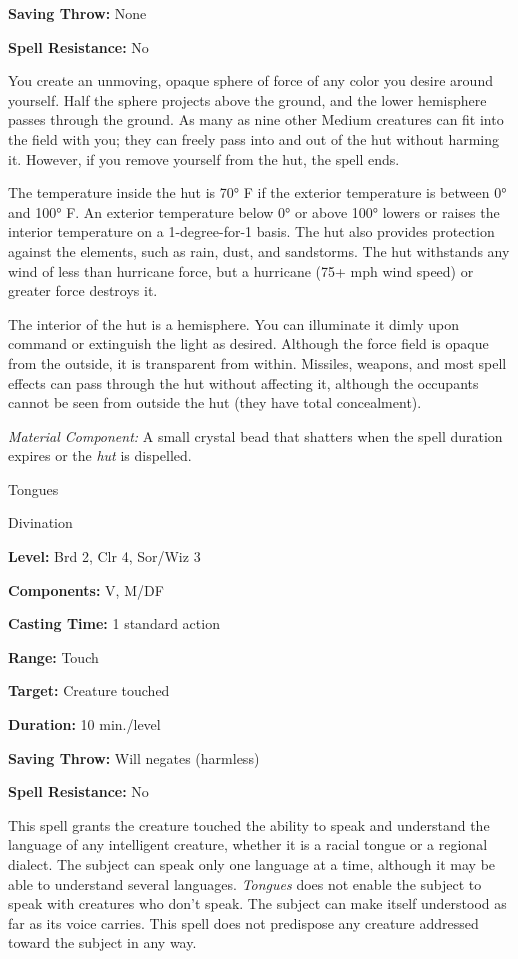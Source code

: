 \documentclass{article}
\begin{document}
\textbf{Saving Throw:} None

\textbf{Spell Resistance:} No

You create an unmoving, opaque sphere of force of any color you desire around yourself. 
Half the sphere projects above the ground, and the lower hemisphere passes through 
the ground. As many as nine other Medium creatures can fit into the field with 
you; they can freely pass into and out of the hut without harming it. However, 
if you remove yourself from the hut, the spell ends.

The temperature inside the hut is 70° F if the exterior temperature is between 
0° and 100° F. An exterior temperature below 0° or above 100° lowers or raises 
the interior temperature on a 1-degree-for-1 basis. The hut also provides protection 
against the elements, such as rain, dust, and sandstorms. The hut withstands any 
wind of less than hurricane force, but a hurricane (75+ mph wind speed) or greater 
force destroys it.

The interior of the hut is a hemisphere. You can illuminate it dimly upon command 
or extinguish the light as desired. Although the force field is opaque from the 
outside, it is transparent from within. Missiles, weapons, and most spell effects 
can pass through the hut without affecting it, although the occupants cannot be 
seen from outside the hut (they have total concealment).

\textit{Material Component: }A small crystal bead that shatters when the spell 
duration expires or the \textit{hut }is dispelled.

\vspace{12pt}
Tongues

Divination

\textbf{Level:} Brd 2, Clr 4, Sor/Wiz 3

\textbf{Components:} V, M/DF

\textbf{Casting Time:} 1 standard action

\textbf{Range:} Touch

\textbf{Target:} Creature touched

\textbf{Duration:} 10 min./level

\textbf{Saving Throw: }Will negates (harmless)

\textbf{Spell Resistance:} No

This spell grants the creature touched the ability to speak and understand the 
language of any intelligent creature, whether it is a racial tongue or a regional 
dialect. The subject can speak only one language at a time, although it may be 
able to understand several languages. \textit{Tongues }does not enable the subject 
to speak with creatures who don't speak. The subject can make itself understood 
as far as its voice carries. This spell does not predispose any creature addressed 
toward the subject in any way.
\end{document}
